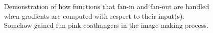 \documentclass[
  11pt,
  numbers=noendperiod]{book}
\begin{document}
\begin{figure}

\begin{minipage}[t]{0.50\linewidth}

{\centering 


}

\end{minipage}%
%
\begin{minipage}[t]{0.50\linewidth}

{\centering 


}

\end{minipage}%

\caption{\label{fig-fan}Demonstration of how functions that fan-in and
fan-out are handled when gradients are computed with respect to their
input(s). Somehow gained fun pink coathangers in the image-making process.}

\end{figure}
\end{document}
